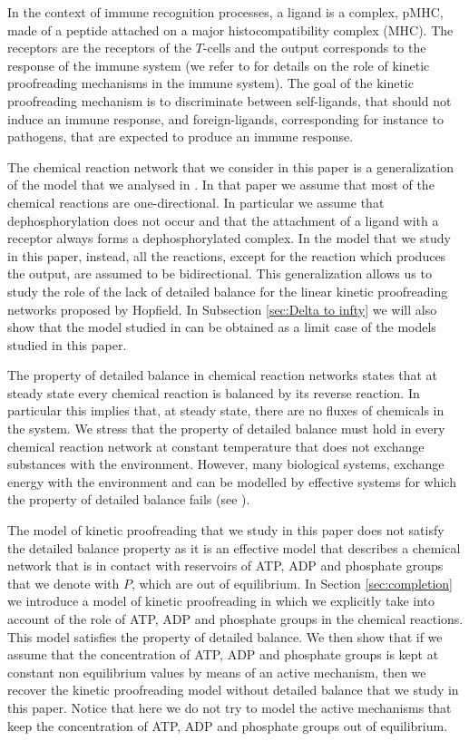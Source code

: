 \documentclass{article}
\numberwithin{equation}{section}
\theoremstyle{plain}
\begin{document}
In the context of immune recognition processes, a ligand is a complex, pMHC, made of a peptide attached on a major histocompatibility complex (MHC). The receptors are the receptors of the $T$-cells and the output corresponds to the response of the immune system (we refer to \cite{janeway2001immunobiology} for details on the role of kinetic proofreading mechanisms in the immune system).
The goal of the kinetic proofreading mechanism is to discriminate between self-ligands, that should not induce an immune response, and foreign-ligands, corresponding for instance to pathogens, that are expected to produce an immune response. 

The chemical reaction network that we consider in this paper is a generalization of the model that we analysed in \cite{franco2025stochastic}. 
In that paper we assume that most of the chemical reactions are one-directional. In particular we assume that dephosphorylation does not occur and that the attachment of a ligand with a receptor always forms a dephosphorylated complex.
In the model that we study in this paper, instead, all the reactions, except for the reaction which produces the output, are assumed to  be bidirectional. 
This generalization allows us to study the role of the lack of detailed balance for the linear kinetic proofreading networks proposed by Hopfield. In Subsection \ref{sec:Delta to infty} we will also show that the model studied in \cite{franco2025stochastic} can be obtained as a limit case of the models studied in this paper.

The property of detailed balance in chemical reaction networks states that at steady state every chemical reaction is balanced by its reverse reaction. 
In particular this implies that, at steady state, there are no fluxes of chemicals in the system. 
We stress that the property of detailed balance must hold in every chemical reaction network at constant temperature that does not exchange substances with the environment. 
However, many biological systems, exchange energy with the environment and can be modelled by effective systems for which the property of detailed balance fails (see \cite{franco2025detailed}). 

The model of kinetic proofreading that we study in this paper does not satisfy the detailed balance property as it is an effective model that describes a chemical network that is in contact with reservoirs of ATP, ADP and phosphate groups that we denote with $P$, which are out of equilibrium. 
In Section \ref{sec:completion} we introduce a model of kinetic proofreading in which we explicitly take into account of the role of ATP, ADP and phosphate groups in the chemical reactions. This model satisfies the property of detailed balance. We then show that if we assume that the concentration of ATP, ADP and phosphate groups is kept at constant non equilibrium values by means of an active mechanism, then we recover the kinetic proofreading model without detailed balance that we study in this paper. 
Notice that here we do not try to model the active mechanisms that keep the concentration of ATP, ADP and phosphate groups out of equilibrium. 
\end{document}
